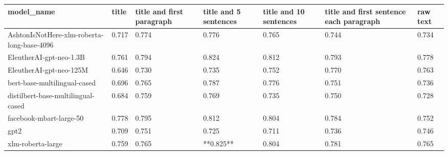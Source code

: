 \begin{tabular}{lllllll}
\toprule
                                model\_name & title & title and first paragraph & title and 5 sentences & title and 10 sentences & title and first sentence each paragraph & raw text \\
\midrule
AshtonIsNotHere-xlm-roberta-long-base-4096 & 0.717 &                     0.774 &                 0.776 &                  0.765 &                                   0.744 &    0.734 \\
                   EleutherAI-gpt-neo-1.3B & 0.761 &                     0.794 &                 0.824 &                  0.812 &                                   0.793 &    0.778 \\
                   EleutherAI-gpt-neo-125M & 0.646 &                     0.730 &                 0.735 &                  0.752 &                                   0.770 &    0.763 \\
              bert-base-multilingual-cased & 0.696 &                     0.765 &                 0.787 &                  0.776 &                                   0.751 &    0.736 \\
        distilbert-base-multilingual-cased & 0.684 &                     0.759 &                 0.769 &                  0.735 &                                   0.750 &    0.728 \\
                   facebook-mbart-large-50 & 0.778 &                     0.795 &                 0.812 &                  0.804 &                                   0.784 &    0.752 \\
                                      gpt2 & 0.709 &                     0.751 &                 0.725 &                  0.711 &                                   0.736 &    0.746 \\
                         xlm-roberta-large & 0.759 &                     0.765 &             **0.825** &                  0.804 &                                   0.781 &    0.765 \\
\bottomrule
\end{tabular}

